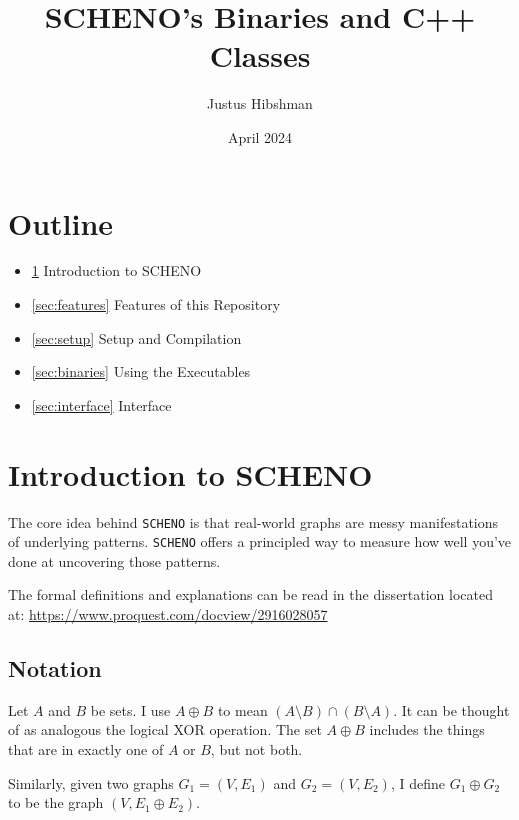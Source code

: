 \documentclass{article}
\begin{document}
\title{SCHENO's Binaries and C++ Classes}

\author{Justus Hibshman}

\date{April 2024}

\maketitle

\vspace{2cm}

\section*{Outline}

\begin{itemize}
    \item \ref{sec:nt_intro} Introduction to SCHENO
    \item \ref{sec:features} Features of this Repository
    \item \ref{sec:setup} Setup and Compilation
    \item \ref{sec:binaries} Using the Executables
    \item \ref{sec:interface} Interface
\end{itemize}


\newpage

\section{Introduction to SCHENO}\label{sec:nt_intro}

The core idea behind \verb|SCHENO| is that real-world graphs are messy manifestations of underlying patterns. \verb|SCHENO| offers a principled way to measure how well you've done at uncovering those patterns.

The formal definitions and explanations can be read in the dissertation located at: \url{https://www.proquest.com/docview/2916028057}

\subsection{Notation}

Let $A$ and $B$ be sets. I use $A \oplus B$ to mean $(A \setminus B) \cap (B \setminus A)$. It can be thought of as analogous the logical XOR operation. The set $A \oplus B$ includes the things that are in exactly one of $A$ or $B$, but not both.

Similarly, given two graphs $G_1 = (V, E_1)$ and $G_2 = (V, E_2)$, I define $G_1 \oplus G_2$ to be the graph $(V, E_1 \oplus E_2)$.
\end{document}

